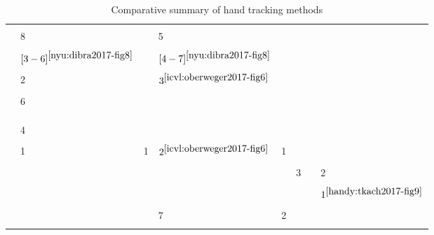 {\begin{longtable}{| l | l | l | l | l | l | l | l |}
\hline & & & & & & & \\[-1.2em]
%
\cite{fourure2017multi} & 8&	&	5&	&	&	&	 \\
\hline & & & & & & & \\[-1.2em]
%
\cite{dibra2017refine} & $[3-6]^{\ref{nyu:dibra2017-fig8}}$ &	&	$[4-7]^{\ref{nyu:dibra2017-fig8}}$ &	&	&	&	\\
\hline & & & & & & & \\[-1.2em]
%
\cite{guo2017region} & 2&	&	$3^{\ref{icvl:oberweger2017-fig6}}$ &	&	&	&	\\
\hline & & & & & & & \\[-1.2em]
%
\cite{madadi2017end} & 6&	&	&	&	&	&	\\
\hline & & & & & & & \\[-1.2em]
%
\cite{mueller2017real} & &	&	&	&	&	&	\\
\hline & & & & & & & \\[-1.2em]
%
\cite{neverova2017hand} & 4&	&	&	&	&	&	\\
\hline & & & & & & & \\[-1.2em]
%
\cite{oberweger2017deepprior++} & 1&	1&	$2^{\ref{icvl:oberweger2017-fig6}}$ &	1&	&	&	\\
\hline & & & & & & & \\[-1.2em]
%
\cite{taylor2017articulated} & &	&	&	&	3&	&	2\\
\hline & & & & & & & \\[-1.2em]
%
\cite{tkach2017online} & &	&	&	&	&	&	$1^{\ref{handy:tkach2017-fig9}}$\\
\hline & & & & & & & \\[-1.2em]
%
\cite{wan2017crossing} & &	&	7&	2&	&	&	\\
\hline

\caption{Comparative summary of hand tracking methods} %
\label{tab:methods_accuracy}
\end{longtable}
}
